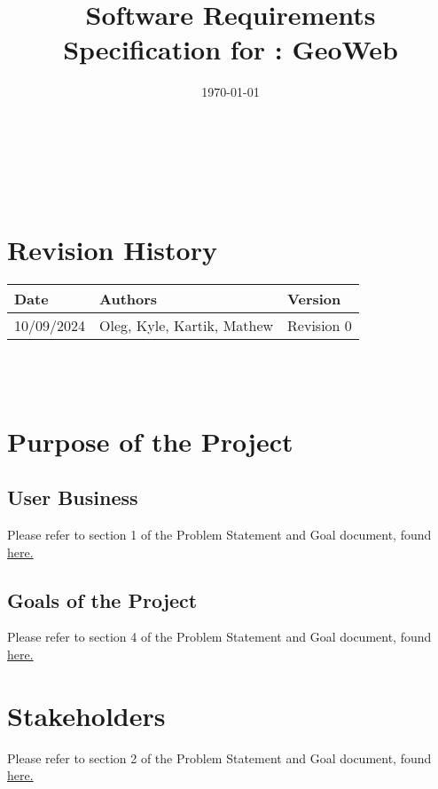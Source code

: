 \documentclass[12pt]{article}
\begin{document}
\title{Software Requirements Specification for \progname: GeoWeb} 
\author{\authname}
\date{\today}
	
\maketitle

~\newpage


\tableofcontents

~\newpage

\section*{Revision History}

\begin{tabularx}{\textwidth}{p{3cm}p{2cm}X}
\toprule {\textbf{Date}} & {\textbf{Authors}} & {\textbf{Version}}\\
\midrule
10/09/2024 & Oleg, Kyle, Kartik, Mathew & Revision 0\\

\bottomrule
\end{tabularx}

~\\

~\newpage
\section{Purpose of the Project}
\subsection{User Business}
Please refer to section 1 of the Problem Statement and Goal document, found \href{https://github.com/OKKM-insights/OKKM.insights/blob/main/docs/ProblemStatementAndGoals/ProblemStatement.pdf}{here.}

\subsection{Goals of the Project}
Please refer to section 4 of the Problem Statement and Goal document, found \href{https://github.com/OKKM-insights/OKKM.insights/blob/main/docs/ProblemStatementAndGoals/ProblemStatement.pdf}{here.}

\section{Stakeholders}
Please refer to section 2 of the Problem Statement and Goal document, found \href{https://github.com/OKKM-insights/OKKM.insights/blob/main/docs/ProblemStatementAndGoals/ProblemStatement.pdf}{here.}
\end{document}
